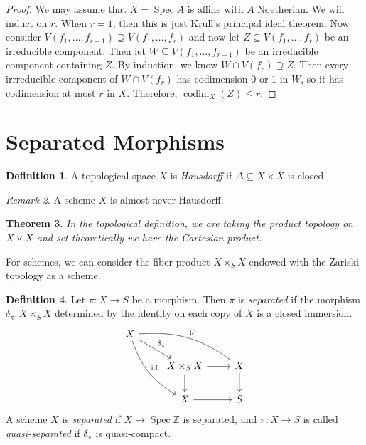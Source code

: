 \documentclass[leqno, openany]{memoir}
\newtheorem{thm}{Theorem}[section]
\theoremstyle{definition}
\newtheorem{defn}[thm]{Definition}
\theoremstyle{remark}
\newtheorem{rmk}[thm]{Remark}
\theoremstyle{plain}
\theoremstyle{definition}
\theoremstyle{remark}
\newcommand{\Z}{\mathbb{Z}}
\newcommand{\mr}[1]{\mathrm{#1}}
\DeclareMathOperator{\Spec}{Spec}
\DeclareMathOperator{\codim}{codim}
\begin{document}
\begin{proof}
    We may assume that $X = \Spec A$ is affine with $A$ Noetherian. We will induct on $r$. When $r = 1$, then this is just Krull's principal ideal theorem. Now consider $V(f_1, \ldots, f_{r-1}) \supseteq V(f_1, \ldots, f_r)$ and now let $Z \subseteq V(f_1, \ldots, f_r)$ be an irreducible component. Then let $W \subseteq V(f_1, \ldots, f_{r-1})$ be an irreducible component containing $Z$. By induction, we know $W \cap V(f_r) \supseteq Z$. Then every irrreducible component of $W \cap V(f_r)$ has codimension $0$ or $1$ in $W$, so it has codimension at most $r$ in $X$. Therefore, $\codim_X (Z) \leq r$.
\end{proof}

\section{Separated Morphisms}%
\label{sec:separated_morphisms}

\begin{defn}
    A topological space $X$ is \textit{Hausdorff} if $\Delta \subseteq X \times X$ is closed.
\end{defn}

\begin{rmk}
    A scheme $X$ is almost never Hausdorff.
\end{rmk}

\begin{thm}
    In the topological definition, we are taking the product topology on $X \times X$ and set-theoretically we have the Cartesian product.
\end{thm}

For schemes, we can consider the fiber product $X \times_S X$ endowed with the Zariski topology as a scheme.
\begin{defn}
    Let $\pi \colon X \to S$ be a morphism. Then $\pi$ is \textit{separated} if the morphism $\delta_{\pi} \colon X \times_S X$ determined by the identity on each copy of $X$ is a closed immersion.
    \begin{equation*}
    \begin{tikzcd}
        X \ar[bend left=20]{drr}{\mr{id}} \ar[bend right=20]{ddr}{\mr{id}} \ar{dr}{\delta_{\pi}} \\
        & X \times_S X \ar{r} \ar{d} & X \ar{d} \\
        & X \ar{r} & S
    \end{tikzcd}
    \end{equation*}
    A scheme $X$ is \textit{separated} if $X \to \Spec \Z$ is separated, and $\pi \colon X \to S$ is called \textit{quasi-separated} if $\delta_{\pi}$ is quasi-compact. 
\end{defn}
\end{document}
